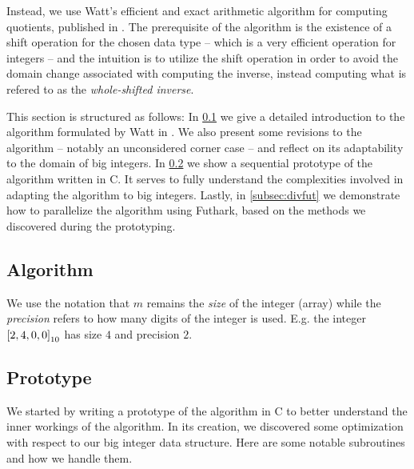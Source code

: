 Instead, we use Watt's efficient and exact arithmetic algorithm for computing
quotients, published in \cite{watt2023efficient}. The prerequisite of the
algorithm is the existence of a shift operation for the chosen data type -- which
is a very efficient operation for integers -- and the intuition is to utilize the
shift operation in order to avoid the domain change associated with computing
the inverse, instead computing what is refered to as the \textit{whole-shifted
  inverse}.

This section is structured as follows: In \ref{subsec:divalg} we give a detailed
introduction to the algorithm formulated by Watt in \cite{watt2023efficient}. We
also present some revisions to the algorithm -- notably an unconsidered corner
case -- and reflect on its adaptability to the domain of big integers. In
\ref{subsec:divproto} we show a sequential prototype of the algorithm written in
C. It serves to fully understand the complexities involved in adapting the
algorithm to big integers. Lastly, in \ref{subsec:divfut} we demonstrate how to
parallelize the algorithm using Futhark, based on the methods we discovered
during the prototyping.

\subsection{Algorithm}
\label{subsec:divalg}
{\red [TODO]}

We use the notation that $m$
remains the \textit{size} of the integer (array) while the \textit{precision}
refers to how many digits of the integer is used. E.g. the integer
$\mathtt{[}2, 4, 0, 0\mathtt{]}_{10}$ has size $4$ and precision $2$.

\subsection{Prototype}
\label{subsec:divproto}
{\red [TODO]}

We started by writing a prototype of the algorithm in C to better understand the
inner workings of the algorithm. In its creation, we discovered some
optimization with respect to our big integer data structure. Here are some
notable subroutines and how we handle them.

